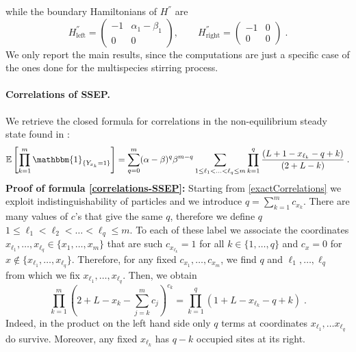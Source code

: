 \documentclass[10pt]{article}
\numberwithin{equation}{section}
\numberwithin{equation}{subsection}
\newcommand{\dt}{\;.}
\begin{document}
while the boundary Hamiltonians of $H^{''}$ are
\begin{equation}
	H^{''}_{\text{left}}=\begin{pmatrix}
		-1&\alpha_{1}-\beta_{1}\\
		0&0
	\end{pmatrix},\qquad H^{''}_{\text{right}}=\begin{pmatrix}
	-1&0\\
	0&0
\end{pmatrix}\dt
\end{equation}
 We only report the main results, since the computations are just a specific case of the ones done for the multispecies stirring process. 
\paragraph{Correlations of SSEP.}
We retrieve the closed formula for correlations in the non-equilibrium steady state found in \cite[(4.26)]{frassek2020eigenstates}:  
\begin{equation}\label{correlations-SSEP}
	\mathbb{E}\left[\prod_{k=1}^{m}\mathbbm{1}_{\{Y_{x_{k}}=1\}}\right]=\sum_{q=0}^{m}(\alpha-\beta)^{q}\beta^{m-q}\sum_{1\leq \ell_{1}<\ldots<\ell_{q}\leq m}\prod_{k=1}^{q}\frac{\left(L+1-x_{\ell_{k}}-q+k\right)}{(2+L-k)}\dt
\end{equation} 
\textbf{Proof of formula \eqref{correlations-SSEP}:} Starting from \eqref{exactCorrelations} we exploit indistinguishability of particles and we introduce $q=\sum_{k=1}^{m}c_{x_{k}}$. There are many values of $c$'s that give the same $q$, therefore we define $q$ %
$1\leq \ell_{1}<\ell_{2}<\ldots<\ell_{q}\leq m$. To each of these label we associate the coordinates $x_{\ell_{1}},\ldots,x_{\ell_{q}}\in\{x_{1},\dots,x_{m}\}$ that are such $c_{x_{\ell_{k}}}=1$ for all $k\in \{1,\ldots,q\}$ and $c_{x}=0$ for $x\notin \{x_{\ell_{1}},\ldots,x_{\ell_{q}}\}$. Therefore, for any fixed $c_{x_{1}},\ldots,c_{x_{m}}$, we find $q$ and $\ell_{1},\ldots,\ell_{q}$ from which we fix $x_{\ell_{1}},\ldots,x_{\ell_{q}}$. Then, we obtain  
	\begin{equation}
		\prod_{k=1}^{m}\left(2+L-x_{k}-\sum_{j=k}^{m}c_{j}\right)^{c_{k}}=\prod_{k=1}^{q}\left(1+L-x_{\ell_{k}}-q+k\right)\dt
	\end{equation}
Indeed, in the product on the left hand side only $q$ terms at coordinates $x_{\ell_{1}},\ldots x_{\ell_{q}}$ do survive. Moreover, any fixed $x_{\ell_{k}}$ has $q-k$ occupied sites at its right.
\end{document}
